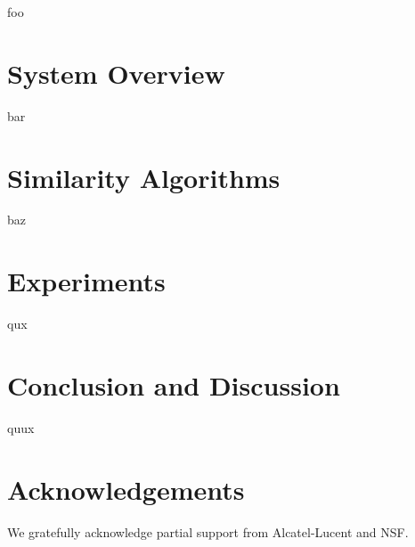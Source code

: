 \documentclass{sig-alternate}
\begin{document}
foo

\section{System Overview}

bar

\section{Similarity Algorithms}

baz

\section{Experiments}

qux

\section{Conclusion and Discussion}

quux

\section{Acknowledgements}

We gratefully acknowledge partial support from Alcatel-Lucent and NSF.

%

%
%

\balancecolumns
\end{document}
